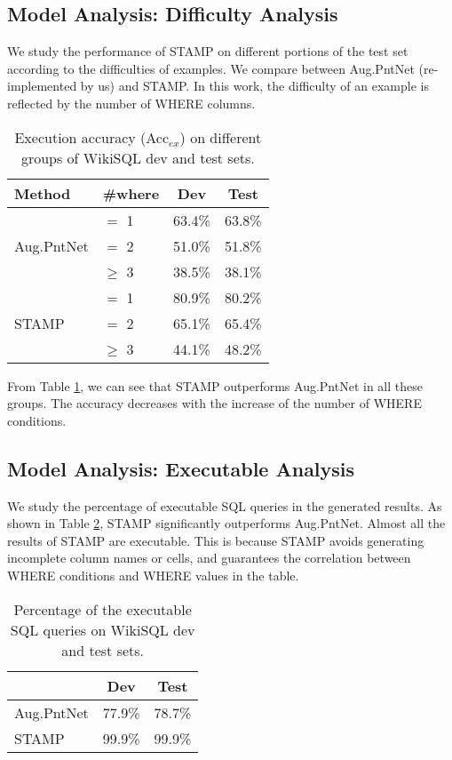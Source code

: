 \documentclass[11pt,a4paper]{article}
\begin{document}
\vspace{-0.3cm}
\subsection{Model Analysis: Difficulty Analysis}
We study the performance of STAMP on different portions of the test set according to the difficulties of examples.
We compare between Aug.PntNet (re-implemented by us) and STAMP.
In this work, the difficulty of an example is reflected by the number of WHERE columns.


\begin{table}[h]
	\centering
	\begin{tabular}{p{2cm}lcc}
		\hline
Method & \#where & Dev & Test\\
\hline
\multirow{3}{*}{Aug.PntNet} &  $=$ 1  & 63.4\%& 63.8\% \\
		& $=$ 2   & 51.0\%& 51.8\%\\
		& $\geq$ 3  & 38.5\%& 38.1\%\\
		\hline
\multirow{3}{*}{STAMP} &  $=$ 1 & 80.9\%& 80.2\%\\
		&$=$ 2  &  65.1\%& 65.4\%\\
		& $\geq$ 3 &  44.1\%& 48.2\%\\
		\hline
	\end{tabular}
	\caption{Execution accuracy (Acc$_{ex}$) on different groups of WikiSQL dev and test sets. }
	\label{table:difficulty}
\end{table}
From Table \ref{table:difficulty}, we can see that STAMP outperforms Aug.PntNet in all these groups.
The accuracy decreases with the increase of the number of WHERE conditions.




\subsection{Model Analysis: Executable Analysis}
We study the percentage of executable SQL queries in the generated results.
As shown in Table \ref{table:executable}, STAMP significantly outperforms Aug.PntNet.
Almost all the results of STAMP are executable.
This is because STAMP avoids generating incomplete column names or cells, and guarantees the correlation between WHERE conditions and WHERE values in the table.


\begin{table}[h]
	\centering
	\begin{tabular}{l|c|c}
		\hline
		& Dev& Test\\
		\hline
		Aug.PntNet &  77.9\%& 78.7\%\\
		STAMP  & 99.9\%& 99.9\%\\
		\hline
	\end{tabular}
	\caption{Percentage of the executable SQL queries on WikiSQL dev and test sets. }
	\label{table:executable}
\end{table}
\end{document}
